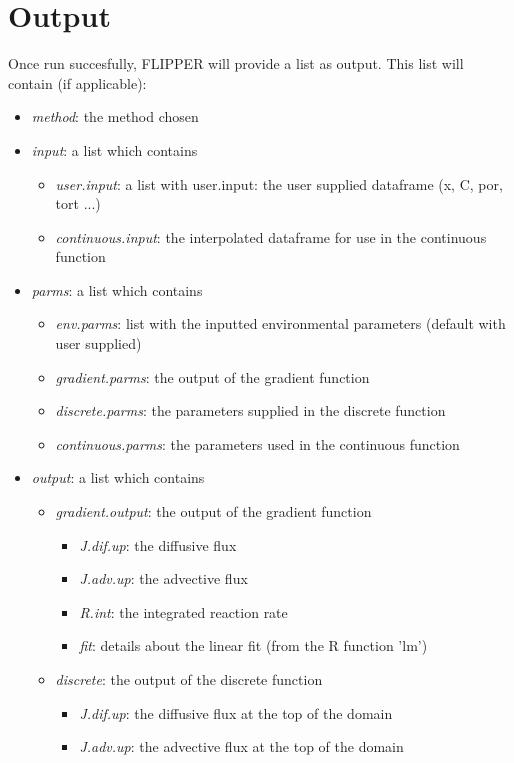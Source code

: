 \documentclass[10pt]{article}
\begin{document}
\section{Output}
Once run succesfully, FLIPPER will provide a list as output. This list will contain (if applicable):
\begin{itemize}
\item \textit{method}: the method chosen
\item \textit{input}: a list which contains
\begin{itemize}
 \item \textit{user.input}: a list with user.input: the user supplied dataframe (x, C, por, tort ...)
 \item \textit{continuous.input}: the interpolated dataframe for use in the continuous function
\end{itemize}
\item \textit{parms}: a list which contains
\begin{itemize}
 \item \textit{env.parms}: list with the inputted environmental parameters (default with user supplied)
 \item \textit{gradient.parms}: the output of the gradient function
 \item \textit{discrete.parms}:  the parameters supplied in the discrete function
 \item \textit{continuous.parms}: the parameters used in the continuous function
\end{itemize}
\item \textit{output}: a list which contains
\begin{itemize}
 \item \textit{gradient.output}: the output of the gradient function
\begin{itemize}
\item  \textit{J.dif.up}: the diffusive flux
\item  \textit{J.adv.up}: the advective flux
\item  \textit{R.int}: the integrated reaction rate
\item  \textit{fit}: details about the linear fit (from the R function 'lm')
\end{itemize}
  \item \textit{discrete}:  the output of the discrete function
\begin{itemize}
\item  \textit{J.dif.up}: the diffusive flux at the top of the domain
\item  \textit{J.adv.up}: the advective flux at the top of the domain

\end{itemize}
\end{itemize}
\end{itemize}
\end{document}
